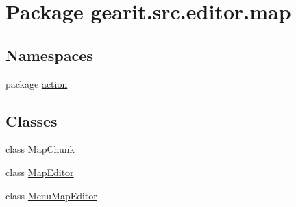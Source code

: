 \hypertarget{namespacegearit_1_1src_1_1editor_1_1map}{\section{Package gearit.\+src.\+editor.\+map}
\label{namespacegearit_1_1src_1_1editor_1_1map}
}
\subsection*{Namespaces}
\begin{DoxyCompactItemize}
\item 
package \hyperlink{namespacegearit_1_1src_1_1editor_1_1map_1_1action}{action}
\end{DoxyCompactItemize}
\subsection*{Classes}
\begin{DoxyCompactItemize}
\item 
class \hyperlink{classgearit_1_1src_1_1editor_1_1map_1_1_map_chunk}{Map\+Chunk}
\item 
class \hyperlink{classgearit_1_1src_1_1editor_1_1map_1_1_map_editor}{Map\+Editor}
\item 
class \hyperlink{classgearit_1_1src_1_1editor_1_1map_1_1_menu_map_editor}{Menu\+Map\+Editor}
\end{DoxyCompactItemize}
